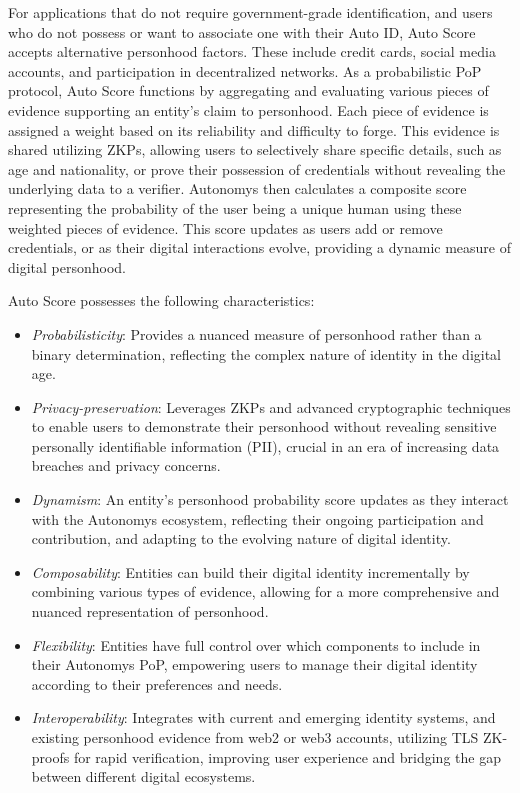 \documentclass[conference]{IEEEtran}
\begin{document}
For applications that do not require government-grade identification, and users who do not possess or want to associate one with their Auto ID, Auto Score accepts alternative personhood factors. These include credit cards, social media accounts, and participation in decentralized networks. As a probabilistic PoP protocol, Auto Score functions by aggregating and evaluating various pieces of evidence supporting an entity's claim to personhood. Each piece of evidence is assigned a weight based on its reliability and difficulty to forge. This evidence is shared utilizing ZKPs, allowing users to selectively share specific details, such as age and nationality, or prove their possession of credentials without revealing the underlying data to a verifier. Autonomys then calculates a composite score representing the probability of the user being a unique human using these weighted pieces of evidence. This score updates as users add or remove credentials, or as their digital interactions evolve, providing a dynamic measure of digital personhood.

Auto Score possesses the following characteristics:
\begin{itemize}
    \item \textit{Probabilisticity}: Provides a nuanced measure of personhood rather than a binary determination, reflecting the complex nature of identity in the digital age.
    \item \textit{Privacy-preservation}: Leverages ZKPs and advanced cryptographic techniques to enable users to demonstrate their personhood without revealing sensitive personally identifiable information (PII), crucial in an era of increasing data breaches and privacy concerns.
    \item \textit{Dynamism}: An entity's personhood probability score updates as they interact with the Autonomys ecosystem, reflecting their ongoing participation and contribution, and adapting to the evolving nature of digital identity.
    \item \textit{Composability}: Entities can build their digital identity incrementally by combining various types of evidence, allowing for a more comprehensive and nuanced representation of personhood.
    \item \textit{Flexibility}: Entities have full control over which components to include in their Autonomys PoP, empowering users to manage their digital identity according to their preferences and needs.
    \item \textit{Interoperability}: Integrates with current and emerging identity systems, and existing personhood evidence from web2 or web3 accounts, utilizing TLS ZK-proofs\cite{tlsnotary2014}\cite{zkpass2023}\cite{reclaim2023} for rapid verification, improving user experience and bridging the gap between different digital ecosystems.
\end{itemize}
\end{document}
